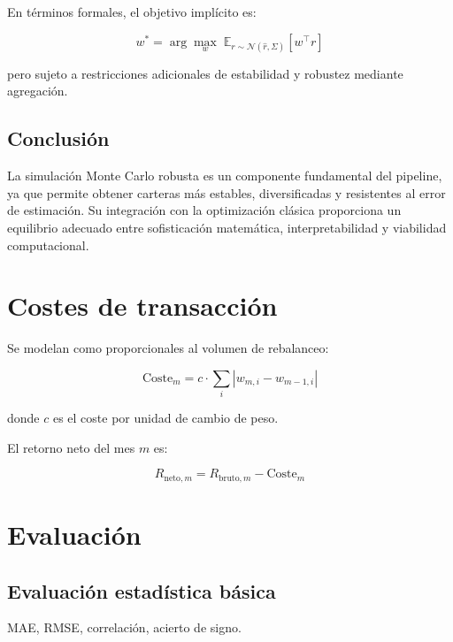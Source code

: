 \documentclass[12pt]{article}
\begin{document}
En términos formales, el objetivo implícito es:



\[
w^\ast = \arg\max_w \; \mathbb{E}_{r \sim \mathcal{N}(\hat{r}, \Sigma)}[w^\top r]
\]



pero sujeto a restricciones adicionales de estabilidad y robustez mediante agregación.

\subsection{Conclusión}

La simulación Monte Carlo robusta es un componente fundamental del pipeline, ya que permite obtener carteras más estables, diversificadas y resistentes al error de estimación. Su integración con la optimización clásica proporciona un equilibrio adecuado entre sofisticación matemática, interpretabilidad y viabilidad computacional.


\section{Costes de transacción}

Se modelan como proporcionales al volumen de rebalanceo:



\[
\text{Coste}_m = c \cdot \sum_i |w_{m,i} - w_{m-1,i}|
\]



donde $c$ es el coste por unidad de cambio de peso.

El retorno neto del mes $m$ es:



\[
R_{\text{neto}, m} = R_{\text{bruto}, m} - \text{Coste}_m
\]



\section{Evaluación}

\subsection{Evaluación estadística básica}

MAE, RMSE, correlación, acierto de signo.

\end{document}
